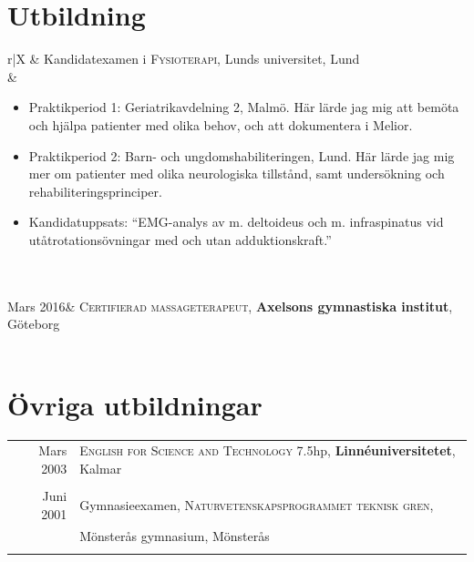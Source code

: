 \documentclass[11pt,a4paper]{article}
\begin{document}
\section{Utbildning}
\begin{tabularx}{\textwidth}{r|X}	
	& Kandidatexamen i \textsc{Fysioterapi}, Lunds universitet, Lund\\
	&\footnotesize{\vspace{-5pt}
		 \begin{itemize}[leftmargin=10pt, topsep=-12.5pt]

		\item Praktikperiod 1: Geriatrikavdelning 2, Malmö. Här lärde jag mig att bemöta och hjälpa patienter med olika behov, och att dokumentera i Melior.
		\item Praktikperiod 2: Barn- och ungdomshabiliteringen, Lund. Här lärde jag mig mer om patienter med olika neuro\-logiska tillstånd, samt undersökning och rehabiliteringsprinciper.
		\item Kandidatuppsats: ``EMG-analys av m. deltoideus och m. infraspinatus vid utåt\-rotations\-övningar med och utan adduktionskraft.''
		\end{itemize}\vspace{-30pt} 
	}\\
	 \\
	Mars 2016& \textsc{Certifierad massageterapeut}, \textbf{Axelsons gymnastiska institut}, Göteborg\\
	 \\
\end{tabularx}

\section{Övriga utbildningar}
\begin{tabularx}{\textwidth}{r|X}	
	Mars 2003& \textsc{English for Science and Technology} 7.5hp, \textbf{Linnéuniversitetet}, Kalmar\\
	\multicolumn{2}{c}{} \\
	
	Juni 2001& Gymnasieexamen, \textsc{Naturvetenskapsprogrammet teknisk gren},\\ 
	&{Mönsterås gymnasium}, Mönsterås\\
	\multicolumn{2}{c}{} \\
\end{tabularx}
\end{document}
